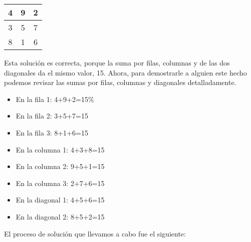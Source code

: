 \begin{center}
\begin{tabular}{|c|c|c|}
\hline 
4  & 9  & 2\tabularnewline
\hline 
3  & 5  & 7\tabularnewline
\hline 
8  & 1  & 6 \tabularnewline
\hline 
\end{tabular}
\par\end{center}

Esta solución es correcta, porque la suma por filas, columnas y de
las dos diagonales da el mismo valor, 15. Ahora, para demostrarle
a alguien este hecho podemos revisar las sumas por filas, columnas
y diagonales detalladamente.
\begin{itemize}
\item En la fila 1: 4+9+2=15\% 
\item En la fila 2: 3+5+7=15
\item En la fila 3: 8+1+6=15
\item En la columna 1: 4+3+8=15
\item En la columna 2: 9+5+1=15
\item En la columna 3: 2+7+6=15
\item En la diagonal 1: 4+5+6=15
\item En la diagonal 2: 8+5+2=15
\end{itemize}
El proceso de solución que llevamos a cabo fue el siguiente:
